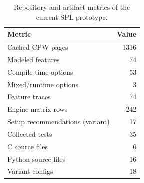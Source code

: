 \begin{table}[t]
\centering
\caption{Repository and artifact metrics of the current SPL prototype.}
\label{tab:repo-metrics}
\small
\begin{tabular}{@{}lr@{}}
\toprule
\textbf{Metric} & \textbf{Value} \\
\midrule
Cached CPW pages & 1316 \\
Modeled features & 74 \\
Compile-time options & 53 \\
Mixed/runtime options & 3 \\
Feature traces & 74 \\
Engine-matrix rows & 242 \\
Setup recommendations (variant) & 17 \\
Collected tests & 35 \\
C source files & 6 \\
Python source files & 16 \\
Variant configs & 18 \\
\bottomrule
\end{tabular}
\end{table}
